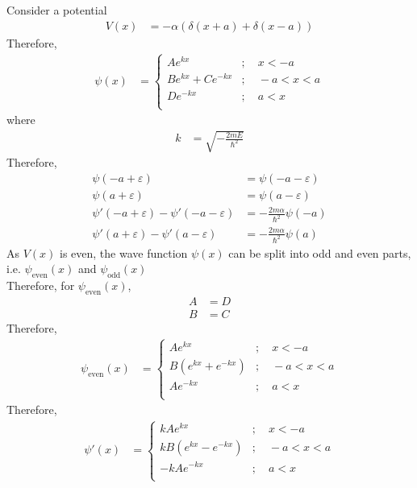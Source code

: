 \documentclass[titlepage, fleqn, a4paper, 12pt, twoside]{article}
\theoremstyle{definition}
\theoremstyle{theorem}
\begin{document}
Consider a potential
\begin{align*}
	V(x) &= -\alpha \left( \delta(x + a) + \delta(x - a) \right)
\end{align*}
Therefore,
\begin{align*}
	\psi(x) &=
		\begin{cases}
			A e^{k x} &;\quad x < -a\\
			B e^{k x} + C e^{-k x} &;\quad -a < x < a\\
			D e^{-k x} &;\quad a < x\\
		\end{cases}
\end{align*}
where
\begin{align*}
	k &= \sqrt{-\frac{2 m E}{\hbar^2}}
\end{align*}
Therefore,
\begin{align*}
	\psi(-a + \varepsilon) &= \psi(-a - \varepsilon)\\
	\psi(a + \varepsilon) &= \psi(a - \varepsilon)\\
	\psi'(-a + \varepsilon) - \psi'(-a - \varepsilon) &= -\frac{2 m \alpha}{\hbar^2} \psi(-a)\\
	\psi'(a + \varepsilon) - \psi'(a - \varepsilon) &= -\frac{2 m \alpha}{\hbar^2} \psi(a)
\end{align*}
As $V(x)$ is even, the wave function $\psi(x)$ can be split into odd and even parts, i.e. $\psi_{\text{even}}(x)$ and $\psi_{\text{odd}}(x)$\\
Therefore, for $\psi_{\text{even}}(x)$,
\begin{align*}
	A &= D\\
	B &= C
\end{align*}
Therefore,
\begin{align*}
	\psi_{\text{even}}(x) &=
		\begin{cases}
			A e^{k x} &;\quad x < -a\\
			B \left( e^{k x} + e^{-k x} \right) &;\quad -a < x < a\\
			A e^{-k x} &;\quad a < x\\
		\end{cases}
\end{align*}
Therefore,
\begin{align*}
	\psi'(x) &=
		\begin{cases}
			k A e^{k x} &;\quad x < -a\\
			k B \left( e^{k x} - e^{-k x} \right) &;\quad -a < x < a\\
			-k A e^{-k x} &;\quad a < x\\
		\end{cases}
\end{align*}
\end{document}
